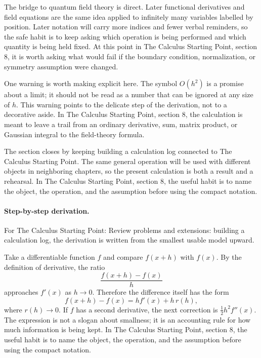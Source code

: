 The bridge to quantum field theory is direct.  Later functional derivatives and field equations are the same idea applied to infinitely many variables labelled by position.  Later notation will carry more indices and fewer verbal reminders, so the safe habit is to keep asking which operation is being performed and which quantity is being held fixed.  At this point in The Calculus Starting Point, section 8, it is worth asking what would fail if the boundary condition, normalization, or symmetry assumption were changed.

One warning is worth making explicit here.  The symbol \(O(h^2)\) is a promise about a limit; it should not be read as a number that can be ignored at any size of \(h\).  This warning points to the delicate step of the derivation, not to a decorative aside.  In The Calculus Starting Point, section 8, the calculation is meant to leave a trail from an ordinary derivative, sum, matrix product, or Gaussian integral to the field-theory formula.

The section closes by keeping building a calculation log connected to The Calculus Starting Point.  The same general operation will be used with different objects in neighboring chapters, so the present calculation is both a result and a rehearsal.  In The Calculus Starting Point, section 8, the useful habit is to name the object, the operation, and the assumption before using the compact notation.



\paragraph{Step-by-step derivation.}

For The Calculus Starting Point: Review problems and extensions: building a calculation log, the derivation is written from the smallest usable model upward.

Take a differentiable function \(f\) and compare \(f(x+h)\) with \(f(x)\).  By the definition of derivative, the ratio
\[
  \frac{f(x+h)-f(x)}{h}
\]
approaches \(f'(x)\) as \(h\to0\).  Therefore the difference itself has the form
\[
  f(x+h)-f(x)=hf'(x)+h\,r(h),
\]
where \(r(h)\to0\).  If \(f\) has a second derivative, the next correction is \(\frac12h^2f''(x)\).  The expression is not a slogan about smallness; it is an accounting rule for how much information is being kept.  In The Calculus Starting Point, section 8, the useful habit is to name the object, the operation, and the assumption before using the compact notation.

